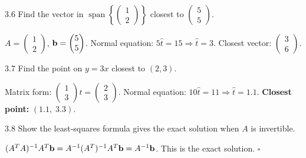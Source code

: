 \begin{exercise}{3.6}
Find the vector in $\operatorname{span}\!\left\{\begin{pmatrix}1\\2\end{pmatrix}\right\}$ closest to $\begin{pmatrix}5\\5\end{pmatrix}$.
\end{exercise}
\begin{solution}
$A=\begin{pmatrix}1\\2\end{pmatrix}$, $\mathbf{b}=\begin{pmatrix}5\\5\end{pmatrix}$.
Normal equation: $5\hat{t}=15 \Rightarrow \hat{t}=3$.
Closest vector: $\begin{pmatrix}3\\6\end{pmatrix}$.
\end{solution}

\begin{exercise}{3.7}
Find the point on $y=3x$ closest to $(2,3)$.
\end{exercise}
\begin{solution}
Matrix form: $\begin{pmatrix}1\\3\end{pmatrix}t=\begin{pmatrix}2\\3\end{pmatrix}$.
Normal equation: $10\hat{t}=11 \Rightarrow \hat{t}=1.1$.
\textbf{Closest point:} $(1.1,\;3.3)$.
\end{solution}

\begin{exercise}{3.8}
Show the least-squares formula gives the exact solution when $A$ is invertible.
\end{exercise}
\begin{solution}
$(A^TA)^{-1}A^T\mathbf{b} = A^{-1}(A^T)^{-1}A^T\mathbf{b} = A^{-1}\mathbf{b}$. This is the exact solution. $\square$
\end{solution}

